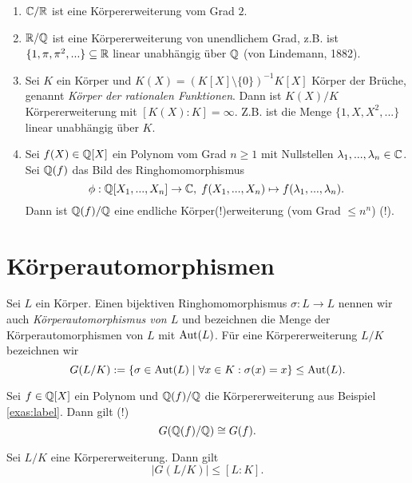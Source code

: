 \documentclass{book}
\begin{document}
\begin{exas}
    \label{exas:label}
    \begin{enumerate}
        \item $\mathbb{C}/\mathbb{R}$ ist eine Körpererweiterung vom Grad $2$.
        \item $\mathbb{R}/\mathbb{Q}$ ist eine Körpererweiterung von unendlichem Grad, z.B.
            ist $\{1,\pi, \pi^2, ... \} \subseteq \mathbb{R}$ linear unabhängig über
            $\mathbb{Q}$ (von Lindemann, 1882).
        \item Sei $K$ ein Körper und $K(X) = (K[X] \setminus \{0\})^{-1} K[X]$
            Körper der Brüche, genannt \emph{Körper der rationalen Funktionen}.
            Dann ist $K(X)/K$ Körpererweiterung mit $[K(X):K] = \infty$. Z.B.
            ist die Menge $\{1,X,X^2, ... \}$ linear unabhängig über $K$. 
        \item Sei $f(X) \in \mathbb{Q}[X]$ ein Polynom vom Grad $n \ge 1$ mit
            Nullstellen $\lambda_1, ..., \lambda_n \in \mathbb{C}$. Sei $\mathbb{Q}(f)$ das Bild
            des Ringhomomorphismus
            \[
                \phi: \QQ[X_1, ..., X_n] \to \CC,\; f(X_1, ..., X_n) \mapsto f(\lambda_1, ..., \lambda_n).
            \]
            Dann ist $\mathbb{Q}(f)/\mathbb{Q}$ eine endliche
            Körper(!)erweiterung (vom Grad $\le n^n$) (!).
    \end{enumerate}
\end{exas}

\section{Körperautomorphismen}%
\label{sec:korperautomorphismen}

Sei $L$ ein Körper. Einen bijektiven Ringhomomorphismus $\sigma: L \to L$
nennen wir auch \emph{Körperautomorphismus von $L$} und bezeichnen die Menge
der Körperautomorphismen von $L$ mit $\operatorname{Aut}(L)$. Für eine Körpererweiterung
$L/K$ bezeichnen wir
\[
    G(L/K) := \{ \sigma \in \operatorname{Aut}(L)\; |\; \forall x \in K: \sigma(x) = x \} \le
    \operatorname{Aut}(L).
\]

\begin{exa}
    \label{exa:galois}
    Sei $f \in \mathbb{Q}[X]$ ein Polynom und $\mathbb{Q}(f)/\mathbb{Q}$ die Körpererweiterung aus
    Beispiel \ref{exas:label}. Dann gilt (!)
    \[
        G(\mathbb{Q}(f)/\mathbb{Q}) \cong G(f).
    \]
\end{exa}

\begin{thm}
    \label{thm:galoisbound}
    Sei $L/K$ eine Körpererweiterung. Dann gilt
    \[
        | G(L/K) | \le [L:K].
    \]
\end{thm}
\end{document}
